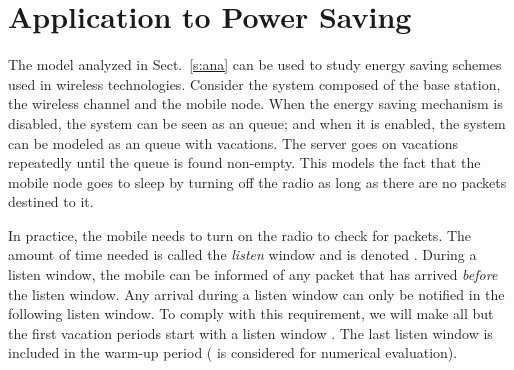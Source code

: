 \documentclass[journal]{IEEEtran}
\begin{document}
\section {Application to Power Saving}
\label{s:illust}
The model analyzed in Sect.~\ref{s:ana} can be used to study energy saving schemes used in wireless technologies. Consider the system composed of the base station, the wireless channel and the mobile node. When the energy saving mechanism is disabled, the system can be seen as an  queue; and when it is enabled, the system can be modeled as an  queue with vacations. The server goes on vacations repeatedly until the queue is found non-empty. This models the fact that the mobile node goes to sleep by turning off the radio as long as there are no packets destined to it.

In practice, the mobile needs to turn on the radio to check for packets. The amount of time needed is called the {\em listen} window and is denoted . During a listen window, the mobile can be informed of any packet that has arrived {\em before} the listen window. Any arrival during a listen window can only be notified in the following listen window. To comply with this requirement, we will make all but the first vacation periods start with a listen window . The last listen window is included in the warm-up period  (  is considered for numerical evaluation).
\end{document}
